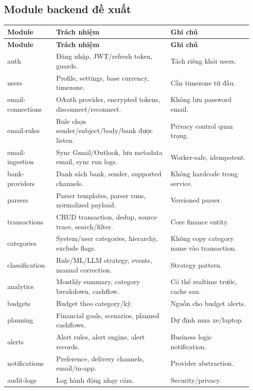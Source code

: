\documentclass[11pt,a4paper]{article}
\renewcommand{\thead}[1]{\textbf{\color{PrimaryDark}#1}}
\newenvironment{tableblock}{\Needspace{8\baselineskip}\vspace{0.25em}}{\vspace{0.75em}}
\begin{document}
\subsection{Module backend đề xuất}
\begin{tableblock}
\scriptsize
\begin{longtable}{L{3.2cm}L{7.0cm}L{4.9cm}}
\thead{Module} & \thead{Trách nhiệm} & \thead{Ghi chú} \\
\endfirsthead
{}\thead{Module} & \thead{Trách nhiệm} & \thead{Ghi chú} \\
\endhead
auth & Đăng nhập, JWT/refresh token, guards. & Tách riêng khỏi users. \\
users & Profile, settings, base currency, timezone. & Cần timezone từ đầu. \\
email-connections & OAuth provider, encrypted tokens, disconnect/reconnect. & Không lưu password email. \\
email-rules & Rule chọn sender/subject/body/bank được listen. & Privacy control quan trọng. \\
email-ingestion & Sync Gmail/Outlook, lưu metadata email, sync run logs. & Worker-safe, idempotent. \\
bank-providers & Danh sách bank, sender, supported channels. & Không hardcode trong service. \\
parsers & Parser templates, parser runs, normalized payload. & Versioned parser. \\
transactions & CRUD transaction, dedup, source trace, search/filter. & Core finance entity. \\
categories & System/user categories, hierarchy, exclude flags. & Không copy category name vào transaction. \\
classification & Rule/ML/LLM strategy, events, manual correction. & Strategy pattern. \\
analytics & Monthly summary, category breakdown, cashflow. & Có thể realtime trước, cache sau. \\
budgets & Budget theo category/kỳ. & Nguồn cho budget alerts. \\
planning & Financial goals, scenarios, planned cashflows. & Dự định mua xe/laptop. \\
alerts & Alert rules, alert engine, alert records. & Business logic notification. \\
notifications & Preference, delivery channels, email/in-app. & Provider abstraction. \\
audit-logs & Log hành động nhạy cảm. & Security/privacy. \\
\end{longtable}
\end{tableblock}
\end{document}
